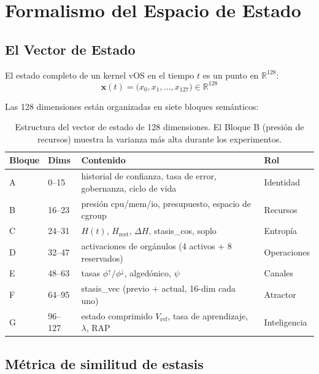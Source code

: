 \documentclass[11pt, a4paper]{article}
\newcommand{\R}{\mathbb{R}}
\newcommand{\sv}{\bm{x}}
\newcommand{\vOS}{\textsf{vOS}}
\begin{document}
\section{Formalismo del Espacio de Estado}
\label{sec:statespace}

\subsection{El Vector de Estado}

El estado completo de un kernel \vOS{} en el tiempo $t$ es un punto en $\R^{128}$:
\begin{equation}
  \sv(t) = \bigl(x_0, x_1, \ldots, x_{127}\bigr) \in \R^{128}
\end{equation}

Las 128 dimensiones están organizadas en siete bloques semánticos:

\begin{table}[h]
\centering
\small
\begin{tabular}{llll}
\toprule
Bloque & Dims & Contenido & Rol \\
\midrule
A & 0--15   & historial de confianza, tasa de error, gobernanza, ciclo de vida & Identidad \\
B & 16--23  & presión cpu/mem/io, presupuesto, espacio de cgroup   & Recursos \\
C & 24--31  & $H(t)$, $H_\text{rest}$, $\Delta H$, stasis\_cos, soplo & Entropía \\
D & 32--47  & activaciones de orgánulos (4 activos + 8 reservados)  & Operaciones \\
E & 48--63  & tasas $\phi^\uparrow/\phi^\downarrow$, algedónico, $\psi$ & Canales \\
F & 64--95  & stasis\_vec (previo + actual, 16-dim cada uno)       & Atractor \\
G & 96--127 & estado comprimido $V_\text{ref}$, tasa de aprendizaje, $\lambda$, RAP & Inteligencia \\
\bottomrule
\end{tabular}
\caption{Estructura del vector de estado de 128 dimensiones.
El Bloque B (presión de recursos) muestra la varianza más alta durante los experimentos.}
\label{tab:blocks}
\end{table}

\subsection{Métrica de similitud de estasis}
\label{sec:stasis_cos}
\end{document}
